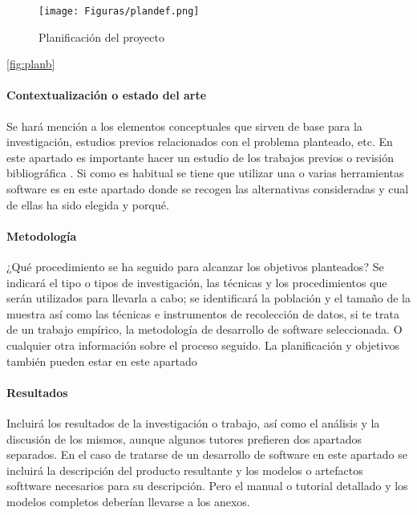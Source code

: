 \begin{figure}
 	\begin{center}
        \texttt{[image: Figuras/plandef.png]}
        	\end{center}
        \caption{Planificación del proyecto}
    \label{fig:plan}
\end{figure}

\ref{fig:planb}

\paragraph{Contextualización o estado del arte}

Se hará mención a los elementos conceptuales que  sirven  de  base  para  la  investigación,  estudios  previos  relacionados  con  el problema planteado, etc. En este apartado es importante hacer un estudio de los trabajos previos o revisión bibliográfica \cite{kitchenham2009systematic,kitchenham_2013}. Si como es habitual se tiene  que utilizar una o varias herramientas software es en este apartado donde se recogen las alternativas consideradas y cual de ellas ha sido elegida  y porqué.

\paragraph{Metodología}
¿Qué procedimiento se ha seguido para alcanzar los objetivos
planteados? Se  indicará  el  tipo  o  tipos  de  investigación,  las  técnicas  y  los procedimientos  que  serán  utilizados  para  llevarla  a  cabo;  se  identificará la población  y  el  tamaño  de  la  muestra  así  como  las técnicas  e  instrumentos  de recolección de datos, si te trata de un trabajo empírico, la metodología de desarrollo de software seleccionada. O cualquier otra información sobre el proceso seguido. La planificación y objetivos también pueden estar en este apartado

 
\paragraph{Resultados}
Incluirá  los  resultados  de  la  investigación  o  trabajo,  así como el análisis y la discusión de los mismos, aunque algunos tutores prefieren dos apartados separados. En el caso de tratarse de un desarrollo de software en este apartado se incluirá la descripción del producto resultante y los modelos o artefactos softtware necesarios para su descripción. Pero el manual o tutorial detallado  y los modelos completos deberían llevarse a los anexos.


